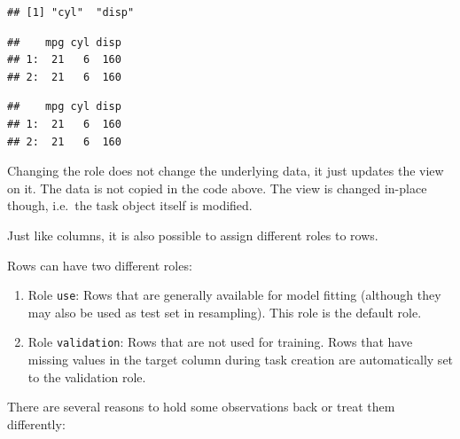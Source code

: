 \documentclass[
]{scrbook}
\newenvironment{Shaded}{\begin{snugshade}}{\end{snugshade}}
\newcommand{\AttributeTok}[1]{\textcolor[rgb]{0.77,0.63,0.00}{#1}}
\newcommand{\CommentTok}[1]{\textcolor[rgb]{0.56,0.35,0.01}{\textit{#1}}}
\newcommand{\DecValTok}[1]{\textcolor[rgb]{0.00,0.00,0.81}{#1}}
\newcommand{\FunctionTok}[1]{\textcolor[rgb]{0.00,0.00,0.00}{#1}}
\newcommand{\NormalTok}[1]{#1}
\newcommand{\SpecialCharTok}[1]{\textcolor[rgb]{0.00,0.00,0.00}{#1}}
\renewenvironment{Shaded} {\begin{snugshade}\small} {\end{snugshade}}
\begin{document}
\begin{verbatim}
## [1] "cyl"  "disp"
\end{verbatim}

\begin{Shaded}
\end{Shaded}

\begin{verbatim}
##    mpg cyl disp
## 1:  21   6  160
## 2:  21   6  160
\end{verbatim}

\begin{Shaded}
\end{Shaded}

\begin{verbatim}
##    mpg cyl disp
## 1:  21   6  160
## 2:  21   6  160
\end{verbatim}

Changing the role does not change the underlying data, it just updates the view on it.
The data is not copied in the code above.
The view is changed in-place though, i.e.~the task object itself is modified.

Just like columns, it is also possible to assign different roles to rows.

Rows can have two different roles:

\begin{enumerate}
\def\labelenumi{\arabic{enumi}.}
\item
  Role \texttt{use}:
  Rows that are generally available for model fitting (although they may also be used as test set in resampling).
  This role is the default role.
\item
  Role \texttt{validation}:
  Rows that are not used for training.
  Rows that have missing values in the target column during task creation are automatically set to the validation role.
\end{enumerate}

There are several reasons to hold some observations back or treat them differently:
\end{document}
